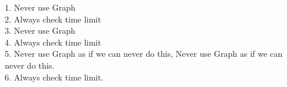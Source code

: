 1. Never use Graph\\
2. Always check time limit\\
3. Never use Graph\\
4. Always check time limit\\
5. Never use Graph as if we can never do this, Never use Graph as if we can never do this.\\
6. Always check time limit.\\ \\